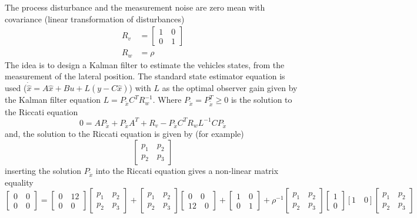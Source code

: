 The process disturbance and the measurement noise are zero mean with covariance (linear transformation of disturbances)
\begin{align}
	R_{v} &= \begin{bmatrix}
	1 \quad 0 \\ 0 \quad 1
	\end{bmatrix} \\
	R_{w} &= \rho
\end{align}
The idea is to design a Kalman filter to estimate the vehicles states, from the measurement of the lateral position. The standard state estimator equation is used ($\dot{\hat{x}} = A\hat{x} + Bu + L(y - C\hat{x})$) with $L$ as the optimal observer gain given by the Kalman filter equation $L = P_{\tilde{x}} C^{T} R_{w}^{-1}$. Where $P_{\tilde{x}} = P^{T}_{\tilde{x}} \geq 0$ is the solution to the Riccati equation
\begin{equation}
0 = A P_{\tilde{x}} + P_{\tilde{x}} A^{T} + R_{v} - P_{\tilde{x}}C^{T}R_{w}L^{-1}CP_{\tilde{x}}
\end{equation}
and, the solution to the Riccati equation is given by (for example)
\begin{equation}
	\begin{bmatrix}
	p_{1} \quad p_{2} \\ p_{2} \quad p_{3}
	\end{bmatrix}
\end{equation}
inserting the solution $P_{\tilde{x}}$ into the Riccati equation gives a non-linear matrix equality
\begin{equation}
	\begin{bmatrix}
	0 \quad 0 \\ 0 \quad 0
	\end{bmatrix} = \begin{bmatrix}
	0 \quad 12 \\ 0 \quad 0
	\end{bmatrix} \begin{bmatrix}
	p_{1} \quad p_{2} \\ p_{2} \quad p_{3}
	\end{bmatrix} + \begin{bmatrix}
	p_{1} \quad p_{2} \\ p_{2} \quad p_{3}
	\end{bmatrix} \begin{bmatrix}
	0 \quad 0 \\ 12 \quad 0
	\end{bmatrix} + \begin{bmatrix}
	1 \quad 0 \\ 0 \quad 1
	\end{bmatrix} + \rho^{-1} \begin{bmatrix}
	p_{1} \quad p_{2} \\ p_{2} \quad p_{3}
	\end{bmatrix} \begin{bmatrix}
	1 \\ 0
	\end{bmatrix} [1 \quad 0] \begin{bmatrix}
	p_{1} \quad p_{2} \\ p_{2} \quad p_{3}
	\end{bmatrix}
\end{equation} 

